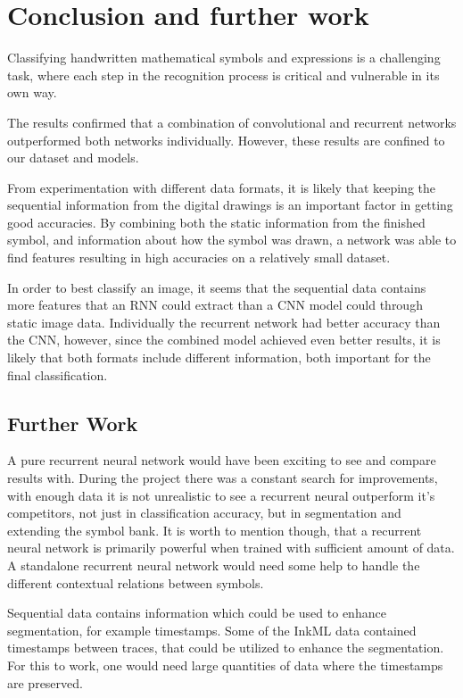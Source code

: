 \chapter{Conclusion and further work}
Classifying handwritten mathematical symbols and expressions is a challenging task, where each step in the recognition process is critical and vulnerable in its own way. 

The results confirmed that a combination of convolutional and recurrent networks outperformed both networks individually. However, these results are confined to our dataset and models.  

From experimentation with different data formats, it is likely that keeping the sequential information from the digital drawings is an important factor in getting good accuracies. By combining both the static information from the finished symbol, and information about how the symbol was drawn, a network was able to find features resulting in high accuracies on a relatively small dataset.

In order to best classify an image, it seems that the sequential data contains more features that an RNN could extract than a CNN model could through static image data. Individually the recurrent network had better accuracy than the CNN, however, since the combined model achieved even better results, it is likely that both formats include different information, both important for the final classification.

\section{Further Work}

A pure recurrent neural network would have been exciting to see and compare results with. During the project there was a constant search for improvements, with enough data it is not unrealistic to see a recurrent neural outperform it's competitors, not just in classification accuracy, but in segmentation and extending the symbol bank. It is worth to mention though, that a recurrent neural network is primarily powerful when trained with sufficient amount of data. A standalone recurrent neural network would need some help to handle the different contextual relations between symbols.

Sequential data contains information which could be used to enhance segmentation, for example timestamps. Some of the InkML data contained timestamps between traces, that could be utilized to enhance the segmentation. For this to work, one would need large quantities of data where the timestamps are preserved.

